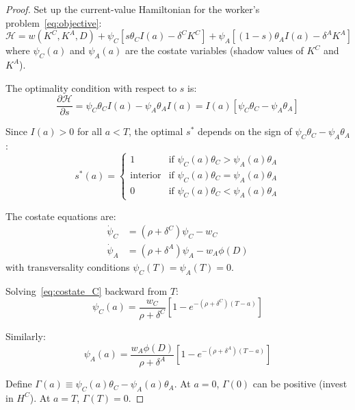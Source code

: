 \documentclass[11pt,a4paper]{article}
\theoremstyle{definition}
\begin{document}
\begin{proof}
Set up the current-value Hamiltonian for the worker's problem~\eqref{eq:objective}:
\begin{equation}
\mathcal{H} = w(K^C, K^A, D) + \psi_C \left[ s \theta_C I(a) - \delta^C K^C \right] + \psi_A \left[ (1-s) \theta_A I(a) - \delta^A K^A \right]
\end{equation}
where $\psi_C(a)$ and $\psi_A(a)$ are the costate variables (shadow values of $K^C$ and $K^A$).

The optimality condition with respect to $s$ is:
\begin{equation}
\frac{\partial \mathcal{H}}{\partial s} = \psi_C \theta_C I(a) - \psi_A \theta_A I(a) = I(a) \left[ \psi_C \theta_C - \psi_A \theta_A \right]
\label{eq:foc_s}
\end{equation}

Since $I(a) > 0$ for all $a < T$, the optimal $s^*$ depends on the sign of $\psi_C \theta_C - \psi_A \theta_A$:
\begin{equation}
s^*(a) = \begin{cases} 1 & \text{if } \psi_C(a) \theta_C > \psi_A(a) \theta_A \\ \text{interior} & \text{if } \psi_C(a) \theta_C = \psi_A(a) \theta_A \\ 0 & \text{if } \psi_C(a) \theta_C < \psi_A(a) \theta_A \end{cases}
\end{equation}

The costate equations are:
\begin{align}
\dot{\psi}_C &= (\rho + \delta^C) \psi_C - w_C \label{eq:costate_C} \\
\dot{\psi}_A &= (\rho + \delta^A) \psi_A - w_A \phi(D) \label{eq:costate_A}
\end{align}
with transversality conditions $\psi_C(T) = \psi_A(T) = 0$.

Solving~\eqref{eq:costate_C} backward from $T$:
\begin{equation}
\psi_C(a) = \frac{w_C}{\rho + \delta^C} \left[ 1 - e^{-(\rho + \delta^C)(T-a)} \right]
\end{equation}

Similarly:
\begin{equation}
\psi_A(a) = \frac{w_A \phi(D)}{\rho + \delta^A} \left[ 1 - e^{-(\rho + \delta^A)(T-a)} \right]
\end{equation}

Define $\Gamma(a) \equiv \psi_C(a) \theta_C - \psi_A(a) \theta_A$. At $a = 0$, $\Gamma(0)$ can be positive (invest in $H^C$). At $a = T$, $\Gamma(T) = 0$.


\end{proof}
\end{document}
